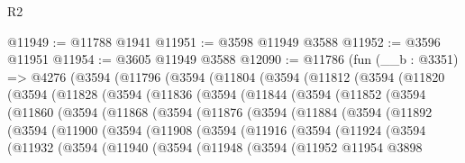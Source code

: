 \begin{lexlean}{R2}
\begin{coremodule}
@11949 := @11788 @1941
@11951 := @3598 @11949 @3588
@11952 := @3596 @11951
@11954 := @3605 @11949 @3588
@12090 := @11786
    (fun (__b : @3351) =>
    @4276
      (@3594
        (@11796
          (@3594
            (@11804
              (@3594
                (@11812
                  (@3594
                    (@11820
                      (@3594
                        (@11828
                          (@3594
                            (@11836
                              (@3594
                                (@11844
                                  (@3594
                                    (@11852
                                      (@3594
                                        (@11860
                                          (@3594
                                            (@11868
                                              (@3594
                                                (@11876
                                                  (@3594
                                                    (@11884
                                                      (@3594
                                                        (@11892
                                                          (@3594
                                                            (@11900
                                                              (@3594
                                                                (@11908
                                                                  (@3594
                                                                    (@11916
                                                                      (@3594
                                                                        (@11924
                                                                          (@3594
                                                                            (@11932
                                                                              (@3594
                                                                                (@11940
                                                                                  (@3594
                                                                                    (@11948
                                                                                      (@3594
                                                                                        (@11952
                                                                                          @11954
                                                                                          @3898

\end{coremodule}
\end{lexlean}
